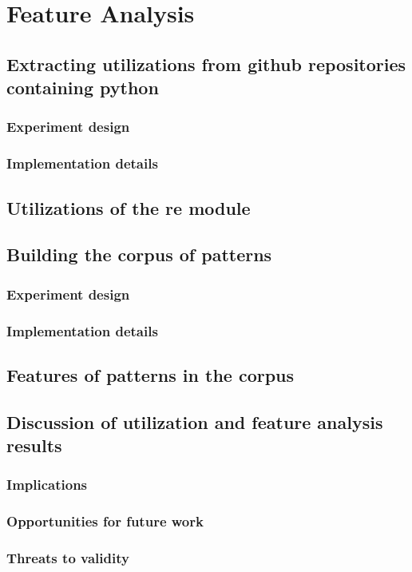 \chapter{Feature Analysis}

\section{Extracting utilizations from github repositories containing python}
\subsection{Experiment design}
\subsection{Implementation details}

\section{Utilizations of the re module}

\section{Building the corpus of patterns}
\subsection{Experiment design}
\subsection{Implementation details}

\section{Features of patterns in the corpus}

\section{Discussion of utilization and feature analysis results}
\subsection{Implications}
\subsection{Opportunities for future work}
\subsection{Threats to validity}
